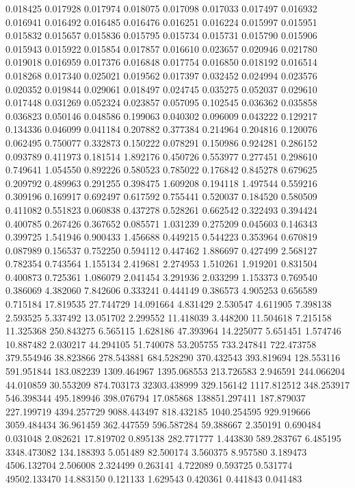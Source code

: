 0.018425
0.017928
0.017974
0.018075
0.017098
0.017033
0.017497
0.016932
0.016941
0.016492
0.016485
0.016476
0.016251
0.016224
0.015997
0.015951
0.015832
0.015657
0.015836
0.015795
0.015734
0.015731
0.015790
0.015906
0.015943
0.015922
0.015854
0.017857
0.016610
0.023657
0.020946
0.021780
0.019018
0.016959
0.017376
0.016848
0.017754
0.016850
0.018192
0.016514
0.018268
0.017340
0.025021
0.019562
0.017397
0.032452
0.024994
0.023576
0.020352
0.019844
0.029061
0.018497
0.024745
0.035275
0.052037
0.029610
0.017448
0.031269
0.052324
0.023857
0.057095
0.102545
0.036362
0.035858
0.036823
0.050146
0.048586
0.199063
0.040302
0.096009
0.043222
0.129217
0.134336
0.046099
0.041184
0.207882
0.377384
0.214964
0.204816
0.120076
0.062495
0.750077
0.332873
0.150222
0.078291
0.150986
0.924281
0.286152
0.093789
0.411973
0.181514
1.892176
0.450726
0.553977
0.277451
0.298610
0.749641
1.054550
0.892226
0.580523
0.785022
0.176842
0.845278
0.679625
0.209792
0.489963
0.291255
0.398475
1.609208
0.194118
1.497544
0.559216
0.309196
0.169917
0.692497
0.617592
0.755441
0.520037
0.184520
0.580509
0.411082
0.551823
0.060838
0.437278
0.528261
0.662542
0.322493
0.394424
0.400785
0.267426
0.367652
0.085571
1.031239
0.275209
0.045603
0.146343
0.399725
1.541946
0.900433
1.456688
0.449215
0.544223
0.353964
0.670819
0.087989
0.156537
0.752250
0.594112
0.447462
1.886697
0.427499
2.568127
0.782354
0.743564
1.155134
2.419681
2.274953
1.510261
1.919201
0.831504
0.400873
0.725361
1.086079
2.041454
3.291936
2.033299
1.153373
0.769540
0.386069
4.382060
7.842606
0.333241
0.444149
0.386573
4.905253
0.656589
0.715184
17.819535
27.744729
14.091664
4.831429
2.530547
4.611905
7.398138
2.593525
5.337492
13.051702
2.299552
11.418039
3.448200
11.504618
7.215158
11.325368
250.843275
6.565115
1.628186
47.393964
14.225077
5.651451
1.574746
10.887482
2.030217
44.294105
51.740078
53.205755
733.247841
722.473758
379.554946
38.823866
278.543881
684.528290
370.432543
393.819694
128.553116
591.951844
183.082239
1309.464967
1395.068553
213.726583
2.946591
244.066204
44.010859
30.553209
874.703173
32303.438999
329.156142
1117.812512
348.253917
546.398344
495.189946
398.076794
17.085868
138851.297411
187.879037
227.199719
4394.257729
9088.443497
818.432185
1040.254595
929.919666
3059.484434
36.961459
362.447559
596.587284
59.388667
2.350191
0.690484
0.031048
2.082621
17.819702
0.895138
282.771777
1.443830
589.283767
6.485195
3348.473082
134.188393
5.051489
82.500174
3.560375
8.957580
3.189473
4506.132704
2.506008
2.324499
0.263141
4.722089
0.593725
0.531774
49502.133470
14.883150
0.121133
1.629543
0.420361
0.441843
0.041483
